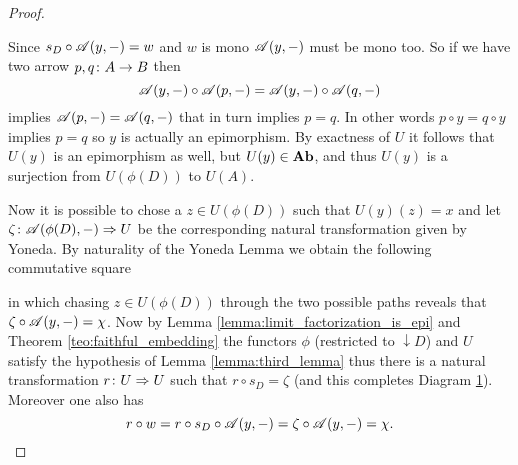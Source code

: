 \begin{proof}
  \begin{figure}
    \begin{center}
    \end{center}
    \caption{}
    \label{diagram:chi}
  \end{figure}

  Since \(s_D\circ{\mathscr A}(y,-) = w\) and \(w\) is mono \({\mathscr A}(y,-)\) must be mono too. So if we have two arrow \(p, q\colon A\to B\) then
  \begin{equation*}
    {\mathscr A}(y,-)\circ{\mathscr A}(p,-) = {\mathscr A}(y,-)\circ{\mathscr A}(q,-)
  \end{equation*}
  implies \({\mathscr A}(p,-) = {\mathscr A}(q,-)\) that in turn implies \(p = q\). In other words \(p\circ y = q\circ y\) implies \(p = q\) so \(y\) is actually an epimorphism. By exactness of \(U\) it follows that \(U(y)\) is an epimorphism as well, but \(U(y)\in\text{\normalfont\textbf{Ab}}\), and thus \(U(y)\) is a surjection from \(U(\phi(D))\) to \(U(A)\).

  Now it is possible to chose a \(z\in U(\phi(D))\) such that \(U(y)(z) = x\) and let \(\zeta\colon {\mathscr A}(\phi(D),-)\Rightarrow U\) be the corresponding natural transformation given by Yoneda. By naturality of the Yoneda Lemma we obtain the following commutative square
  \begin{figure}[ht]
    \begin{center}
    \end{center}
    \captionsetup{labelformat=empty}
  \end{figure}
  in which chasing \(z\in U(\phi(D))\) through the two possible paths reveals that \(\zeta\circ{\mathscr A}(y,-) = \chi\). Now by Lemma \ref{lemma:limit_factorization_is_epi} and Theorem \ref{teo:faithful_embedding} the functors \(\phi\) (restricted to \(\downarrow D\)) and \(U\) satisfy the hypothesis of Lemma \ref{lemma:third_lemma} thus there is a natural transformation \(r\colon U\Rightarrow U\) such that \(r\circ s_D = \zeta\) (and this completes Diagram \ref{diagram:chi}). Moreover one also has
  \begin{equation*}
    r\circ w = r\circ s_D\circ{\mathscr A}(y,-) = \zeta\circ{\mathscr A}(y,-) = \chi.
  \end{equation*}


\end{proof}
